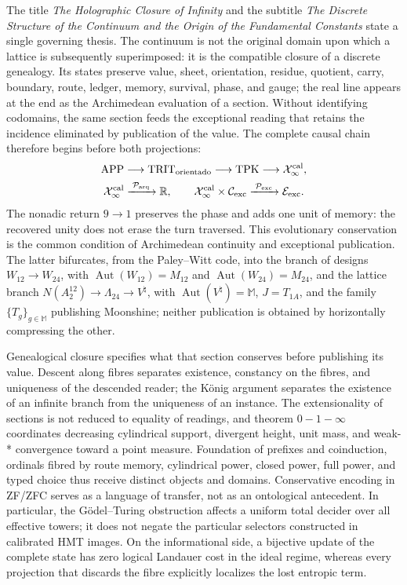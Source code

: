 The title \emph{The Holographic Closure of Infinity} and the subtitle \emph{The Discrete Structure of the Continuum and the Origin of the Fundamental Constants} state a single governing thesis. The continuum is not the original domain upon which a lattice is subsequently superimposed: it is the compatible closure of a discrete genealogy. Its states preserve value, sheet, orientation, residue, quotient, carry, boundary, route, ledger, memory, survival, phase, and gauge; the real line appears at the end as the Archimedean evaluation of a section. Without identifying codomains, the same section feeds the exceptional reading that retains the incidence eliminated by publication of the value. The complete causal chain therefore begins before both projections:
\[
\begin{gathered}
 \mathrm{APP}
 \longrightarrow \mathrm{TRIT}_{\rm orientado}
 \longrightarrow \mathrm{TPK}
 \longrightarrow \mathcal X_\infty^{\rm cal},\\
 \mathcal X_\infty^{\rm cal}
 \xrightarrow{\;\mathcal P_{\rm arq}\;}\mathbb R,
 \qquad
 \mathcal X_\infty^{\rm cal}\times\mathcal C_{\rm exc}
 \xrightarrow{\;\mathcal P_{\rm exc}\;}\mathcal E_{\rm exc}.
\end{gathered}
\]
The nonadic return \(9\to1\) preserves the phase and adds one unit of memory:
the recovered unity does not erase the turn traversed. This evolutionary conservation
is the common condition of Archimedean continuity and exceptional publication.
The latter bifurcates, from the Paley--Witt code, into the branch
of designs \(W_{12}\to W_{24}\), with
\(\operatorname{Aut}(W_{12})=M_{12}\) and
\(\operatorname{Aut}(W_{24})=M_{24}\), and the lattice branch
\(N(A_2^{12})\to\Lambda_{24}\to V^\natural\), with
\(\operatorname{Aut}(V^\natural)=\mathbb M\), \(J=T_{1A}\), and the family
\(\{T_g\}_{g\in\mathbb M}\) publishing Moonshine;
neither publication is obtained by horizontally compressing the other.

Genealogical closure specifies what that section conserves before publishing its
value. Descent along fibres separates existence, constancy on the fibres, and
uniqueness of the descended reader; the König argument separates the existence of
an infinite branch from the uniqueness of an instance. The extensionality of sections
is not reduced to equality of readings, and theorem \(0\!-1\!-\!\infty\)
coordinates decreasing cylindrical support, divergent height, unit mass, and
weak-* convergence toward a point measure. Foundation of prefixes and
coinduction, ordinals fibred by route memory, cylindrical power,
closed power, full power, and typed choice thus receive distinct objects and
domains. Conservative encoding in ZF/ZFC serves as a language
of transfer, not as an ontological antecedent. In particular, the
Gödel--Turing obstruction affects a uniform total decider over all
effective towers; it does not negate the particular selectors constructed in
calibrated HMT images. On the informational side, a bijective update
of the complete state has zero logical Landauer cost in the ideal
regime, whereas every projection that discards the fibre explicitly localizes
the lost entropic term.

